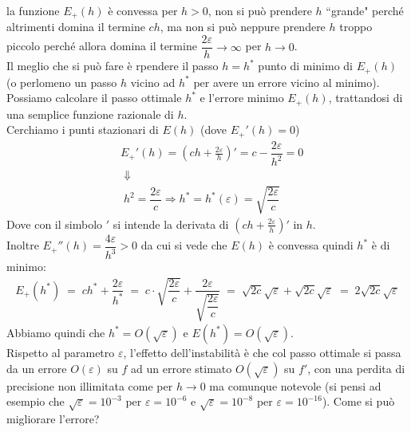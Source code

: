 la funzione $E_+(h)$ è convessa per $h>0$, non si può prendere $h$ ``grande" perché altrimenti domina il termine $ch$, ma
non si può neppure prendere $h$ troppo piccolo perché allora domina il termine $\dfrac{2\varepsilon}{h}\to \infty$ per $h\to 0$.\\
Il meglio che si può fare è rpendere il passo $h=h^*$ punto di minimo di $E_+(h)$ (o perlomeno un passo $h$ vicino ad $h^*$ per avere un errore vicino al minimo).\\
Possiamo calcolare il passo ottimale $h^*$ e l'errore minimo $E_+(h)$, trattandosi di una semplice funzione razionale di $h$.\\
Cerchiamo i punti stazionari di $E(h)$ (dove $E_+'(h)=0$)
\[ \begin{split}
	& E_+'(h)=\left( ch+\frac{2\varepsilon}{h}\right) ' =c-\dfrac{2\varepsilon}{h^2}=0 \\
	& \; \Downarrow \\
	& \; h^2=\dfrac{2\varepsilon}{c}\Rightarrow h^*=h^*(\varepsilon)=\sqrt{\dfrac{2\varepsilon}{c}}
\end{split} \]
Dove con il simbolo $'$ si intende la derivata di $\left( ch+\frac{2\varepsilon}{h}\right) '$ in $h$.\\
Inoltre $E_+''(h)=\dfrac{4\varepsilon}{h^3}>0$ da cui si vede che $E(h)$ è convessa quindi $h^*$ è di minimo:
\[ \begin{split}
	E_+(h^*) \; = \; ch^* + \dfrac{2\varepsilon}{h^*} \; = \; c\cdot \sqrt{\dfrac{2\varepsilon}{c}} + \dfrac{2\varepsilon}{\sqrt{\dfrac{2\varepsilon}{c}}} \; = \; \sqrt{2c} \sqrt{\varepsilon} + \sqrt{2c} \sqrt{\varepsilon} \; = \; 2 \sqrt{2c} \sqrt{\varepsilon}
\end{split} \]
Abbiamo quindi che $h^*=O(\sqrt{\varepsilon})$ e $E(h^*)=O(\sqrt{\varepsilon})$.\\
Rispetto al parametro $\varepsilon$, l'effetto dell'instabilità è che col passo ottimale si passa da un errore $O(\varepsilon)$ su $f$ ad un errore stimato $O(\sqrt{\varepsilon})$ su $f'$, con una perdita di precisione non illimitata come per $h\to 0$ ma comunque notevole (si pensi ad esempio che $\sqrt{\varepsilon}=10^{-3}$ per $\varepsilon=10^{-6}$ e $\sqrt{\varepsilon}=10^{-8}$ per $\varepsilon=10^{-16}$).
Come si può migliorare l'errore?\\

